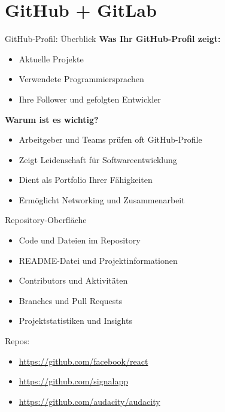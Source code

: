 \documentclass[compress,aspectratio=169]{beamer}
\begin{document}
	\section{GitHub + GitLab}

	\begin{frame}{GitHub-Profil: Überblick}
		\textbf{Was Ihr GitHub-Profil zeigt:}
		\begin{itemize}
			\item Aktuelle Projekte
			\item Verwendete Programmiersprachen
			\item Ihre Follower und gefolgten Entwickler
		\end{itemize}
		\vspace{1em}
		\textbf{Warum ist es wichtig?}
		\begin{itemize}
			\item Arbeitgeber und Teams prüfen oft GitHub-Profile
			\item Zeigt Leidenschaft für Softwareentwicklung
			\item Dient als Portfolio Ihrer Fähigkeiten
			\item Ermöglicht Networking und Zusammenarbeit
		\end{itemize}
	\end{frame}

	\begin{frame}{Repository-Oberfläche}
		\begin{itemize}
			\item Code und Dateien im Repository
			\item README-Datei und Projektinformationen
			\item Contributors und Aktivitäten
			\item Branches und Pull Requests
			\item Projektstatistiken und Insights
		\end{itemize}
		Repos: 
		\begin{itemize}
			\item \url{https://github.com/facebook/react}
			\item \url{https://github.com/signalapp}
			\item \url{https://github.com/audacity/audacity}
		\end{itemize}
	\end{frame}


	
\end{document}
